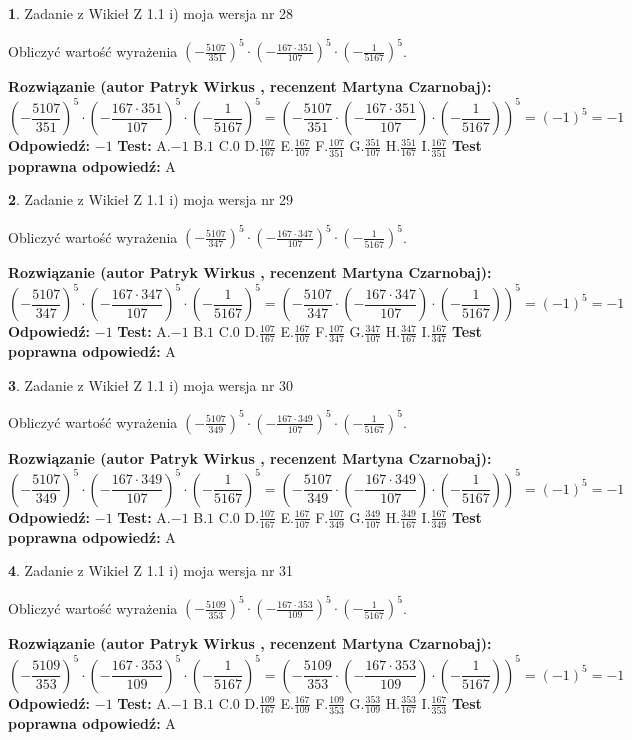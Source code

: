 \documentclass[12pt, a4paper]{article}
\theoremstyle{definition} %
\newtheorem{zad}{}
\newcommand{\zadStart}[1]{\begin{zad}#1\newline}
\newcommand{\zadStop}{\end{zad}}
\newcommand{\rozwStart}[2]{\noindent \textbf{Rozwiązanie (autor #1 , recenzent #2): }\newline}
\newcommand{\rozwStop}{\newline}
\newcommand{\odpStart}{\noindent \textbf{Odpowiedź:}\newline}
\newcommand{\odpStop}{\newline}
\newcommand{\testStart}{\noindent \textbf{Test:}\newline}
\newcommand{\testStop}{\newline}
\newcommand{\kluczStart}{\noindent \textbf{Test poprawna odpowiedź:}\newline}
\newcommand{\kluczStop}{\newline}
\begin{document}
\zadStart{Zadanie z Wikieł Z 1.1 i) moja wersja nr 28}

Obliczyć wartość wyrażenia $(-\frac{5107}{351})^{5} \cdot (-\frac{167 \cdot 351}{107})^{5} \cdot (-\frac{1}{5167})^{5}$.
\zadStop
\rozwStart{Patryk Wirkus}{Martyna Czarnobaj}
$$(-\frac{5107}{351})^{5} \cdot (-\frac{167 \cdot 351}{107})^{5} \cdot (-\frac{1}{5167})^{5} = (-\frac{5107}{351} \cdot (-\frac{167 \cdot 351}{107}) \cdot (-\frac{1}{5167}))^{5} = (-1)^{5} = -1$$
\rozwStop
\odpStart
$-1$
\odpStop
\testStart
A.$-1$ B.$1$ C.$0$ D.$\frac{107}{167}$ E.$\frac{167}{107}$
F.$\frac{107}{351}$ G.$\frac{351}{107}$
H.$\frac{351}{167}$
I.$\frac{167}{351}$
\testStop
\kluczStart
A
\kluczStop



\zadStart{Zadanie z Wikieł Z 1.1 i) moja wersja nr 29}

Obliczyć wartość wyrażenia $(-\frac{5107}{347})^{5} \cdot (-\frac{167 \cdot 347}{107})^{5} \cdot (-\frac{1}{5167})^{5}$.
\zadStop
\rozwStart{Patryk Wirkus}{Martyna Czarnobaj}
$$(-\frac{5107}{347})^{5} \cdot (-\frac{167 \cdot 347}{107})^{5} \cdot (-\frac{1}{5167})^{5} = (-\frac{5107}{347} \cdot (-\frac{167 \cdot 347}{107}) \cdot (-\frac{1}{5167}))^{5} = (-1)^{5} = -1$$
\rozwStop
\odpStart
$-1$
\odpStop
\testStart
A.$-1$ B.$1$ C.$0$ D.$\frac{107}{167}$ E.$\frac{167}{107}$
F.$\frac{107}{347}$ G.$\frac{347}{107}$
H.$\frac{347}{167}$
I.$\frac{167}{347}$
\testStop
\kluczStart
A
\kluczStop



\zadStart{Zadanie z Wikieł Z 1.1 i) moja wersja nr 30}

Obliczyć wartość wyrażenia $(-\frac{5107}{349})^{5} \cdot (-\frac{167 \cdot 349}{107})^{5} \cdot (-\frac{1}{5167})^{5}$.
\zadStop
\rozwStart{Patryk Wirkus}{Martyna Czarnobaj}
$$(-\frac{5107}{349})^{5} \cdot (-\frac{167 \cdot 349}{107})^{5} \cdot (-\frac{1}{5167})^{5} = (-\frac{5107}{349} \cdot (-\frac{167 \cdot 349}{107}) \cdot (-\frac{1}{5167}))^{5} = (-1)^{5} = -1$$
\rozwStop
\odpStart
$-1$
\odpStop
\testStart
A.$-1$ B.$1$ C.$0$ D.$\frac{107}{167}$ E.$\frac{167}{107}$
F.$\frac{107}{349}$ G.$\frac{349}{107}$
H.$\frac{349}{167}$
I.$\frac{167}{349}$
\testStop
\kluczStart
A
\kluczStop



\zadStart{Zadanie z Wikieł Z 1.1 i) moja wersja nr 31}

Obliczyć wartość wyrażenia $(-\frac{5109}{353})^{5} \cdot (-\frac{167 \cdot 353}{109})^{5} \cdot (-\frac{1}{5167})^{5}$.
\zadStop
\rozwStart{Patryk Wirkus}{Martyna Czarnobaj}
$$(-\frac{5109}{353})^{5} \cdot (-\frac{167 \cdot 353}{109})^{5} \cdot (-\frac{1}{5167})^{5} = (-\frac{5109}{353} \cdot (-\frac{167 \cdot 353}{109}) \cdot (-\frac{1}{5167}))^{5} = (-1)^{5} = -1$$
\rozwStop
\odpStart
$-1$
\odpStop
\testStart
A.$-1$ B.$1$ C.$0$ D.$\frac{109}{167}$ E.$\frac{167}{109}$
F.$\frac{109}{353}$ G.$\frac{353}{109}$
H.$\frac{353}{167}$
I.$\frac{167}{353}$
\testStop
\kluczStart
A
\kluczStop
\end{document}
